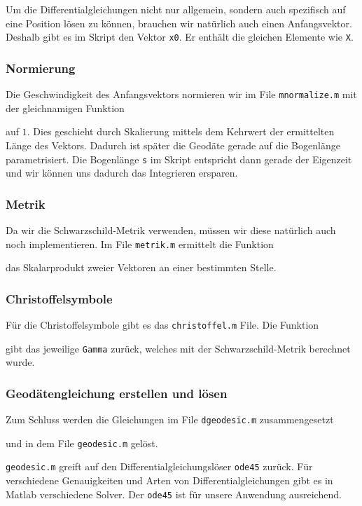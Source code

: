 \begin{refsection}
    Um die Differentialgleichungen nicht nur allgemein, sondern auch spezifisch auf eine Position lösen zu können, brauchen wir natürlich auch einen Anfangsvektor. Deshalb gibt es im Skript den Vektor \texttt{x0}. Er enthält die gleichen Elemente wie \texttt{X}.
    
    \subsubsection{Normierung}
    Die Geschwindigkeit des Anfangsvektors normieren wir im File \texttt{mnormalize.m} mit der gleichnamigen Funktion 
     
    auf $1$. Dies geschieht durch Skalierung mittels dem Kehrwert der ermittelten Länge des Vektors. Dadurch ist später die Geodäte gerade auf die Bogenlänge parametrisiert. Die Bogenlänge \texttt{s} im Skript entspricht dann gerade der Eigenzeit und wir können uns dadurch das Integrieren ersparen.
    
    \subsubsection{Metrik}
    Da wir die Schwarzschild-Metrik verwenden, müssen wir diese natürlich auch noch implementieren.
    Im File \texttt{metrik.m} ermittelt die Funktion
     
    das Skalarprodukt zweier Vektoren an einer bestimmten Stelle.
    \subsubsection{Christoffelsymbole}
    Für die Christoffelsymbole gibt es das \texttt{christoffel.m} File. Die Funktion 
     
    gibt das jeweilige \texttt{Gamma} zurück, welches mit der Schwarzschild-Metrik berechnet wurde.
    \subsubsection{Geodätengleichung erstellen und lösen}
    Zum Schluss werden die Gleichungen im File \texttt{dgeodesic.m} zusammengesetzt
     
    und in dem File \texttt{geodesic.m} gelöst. 
     
    \texttt{geodesic.m} greift auf den Differentialgleichungslöser \texttt{ode45} zurück. Für verschiedene Genauigkeiten und Arten von Differentialgleichungen gibt es in Matlab verschiedene Solver. Der \texttt{ode45} ist für unsere Anwendung ausreichend.
    

\end{refsection}
